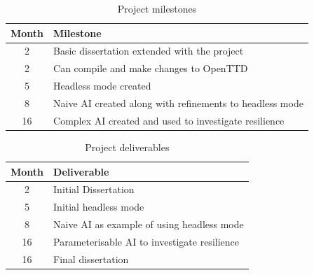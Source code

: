 \documentclass[a4paper,11pt]{article}
\begin{document}
\begin{table}[htbp]
    \begin{center}
        \begin{tabular}{|S[table-format=2.0]|l|}
        \hline
    \textbf{Month} & \textbf{Milestone} \\
         & Basic dissertation extended with the project \\
        2 & Can compile and make changes to OpenTTD \\
        5 & Headless mode created \\
        8 & Naive AI created along with refinements to headless mode \\
        16 & Complex AI created and used to investigate resilience \\
        \hline
        \end{tabular} 
    \end{center}
    \caption[Project milestones]{Project milestones}
    \label{table:milestones}
\end{table}
\begin{table}[htbp]
    \vspace{0.5cm}
    \begin{center}
        \begin{tabular}{|S[table-format=2.0]|l|}
        \hline
        \textbf{Month} & \textbf{Deliverable} \\
         & Initial Dissertation \\
        5 & Initial headless mode \\
        8 & Naive AI as example of using headless mode \\
        16 & Parameterisable AI to investigate resilience \\
        16 & Final dissertation \\
        \hline
        \end{tabular} 
    \end{center}
    \caption[Project deliverables]{Project deliverables}
    \label{table:deliverables}
\end{table}

\pagebreak

{\small
}
\end{document}
